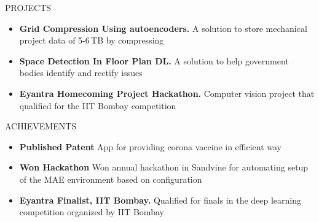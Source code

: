\documentclass{resume} %
\begin{document}

\begin{rSection}{PROJECTS}
\begin{itemize}
\itemsep -6pt
\item \textbf{Grid Compression Using autoencoders.} {A solution to store mechanical project data of 5-6\,TB by compressing}
\item \textbf{Space Detection In Floor Plan DL.} {A solution to help government bodies identify and rectify issues}
\item \textbf{Eyantra Homecoming Project Hackathon.} {Computer vision project that qualified for the IIT Bombay competition}
\end{itemize}
\end{rSection}



\begin{rSection}{ACHIEVEMENTS}
\begin{itemize}
\itemsep -6pt
\item \textbf{Published Patent} {App for providing corona vaccine in efficient way}
\item \textbf{Won Hackathon} {Won annual hackathon in Sandvine for automating setup of the MAE environment based on configuration}
\item \textbf{Eyantra Finalist, IIT Bombay.} {Qualified for finals in the deep learning competition organized by IIT Bombay}
\end{itemize}
\end{rSection}
\end{document}
